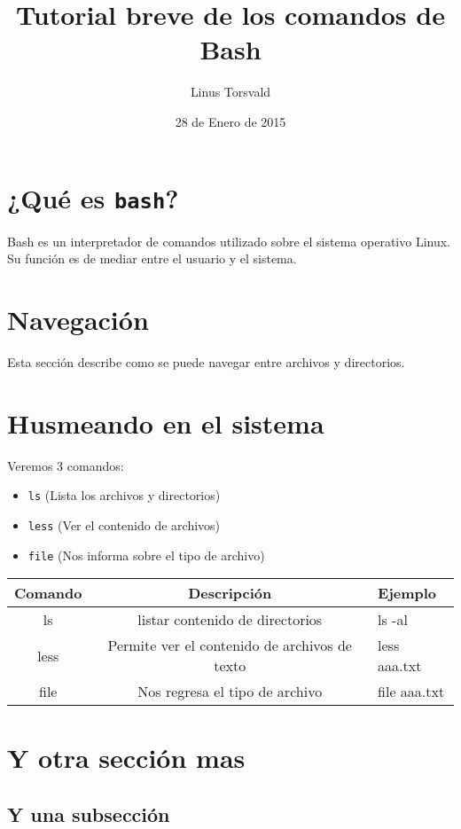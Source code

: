 \documentclass[12pt]{article}
\title{Tutorial breve de los comandos de Bash}
\author{Linus Torsvald}
\date{28 de Enero de 2015}
\begin{document}
\maketitle

\section{¿Qué es {\tt bash}?}

Bash es un interpretador de comandos utilizado sobre el sistema operativo Linux.
Su función es de mediar entre el usuario y el sistema.

\section{Navegación}

Esta sección describe como se puede navegar entre archivos y directorios.

\section{Husmeando en el sistema}

Veremos 3 comandos:

\begin{itemize}
\item {\tt ls} (Lista los archivos y directorios) 
\item {\tt less} (Ver el contenido de archivos)
\item {\tt file} (Nos informa sobre el tipo de archivo)
\end{itemize}

\begin{tabular}{|c|c|l|}
\hline
Comando & Descripción & Ejemplo \\
\hline
ls & listar contenido de directorios & ls -al \\
less & Permite ver el contenido de archivos de texto & less aaa.txt \\
file & Nos regresa el tipo de archivo & file aaa.txt \\
\hline
\end{tabular} 

\section{Y otra sección mas}
\subsection{Y una subsección}


\end{document}
